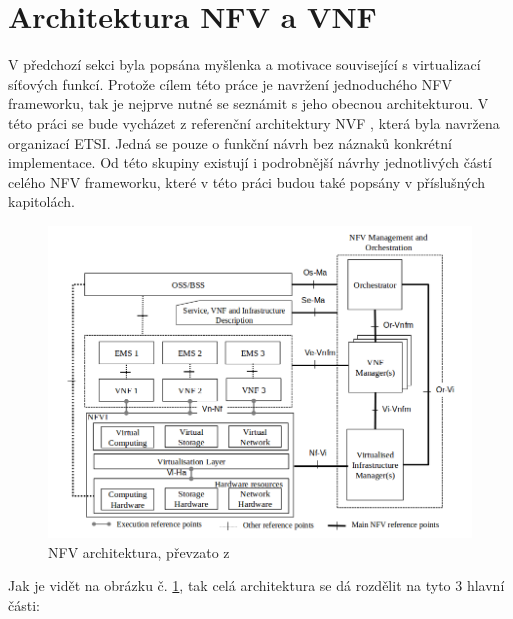 \section{Architektura NFV a VNF}

V předchozí sekci byla popsána myšlenka a motivace související s virtualizací síťových funkcí. Protože cílem této práce je navržení jednoduchého NFV frameworku, tak je nejprve nutné se seznámit s jeho obecnou architekturou. V této práci se bude vycházet z referenční architektury NVF \cite{NFV_architektura}, která byla navržena organizací ETSI. Jedná se pouze o funkční návrh bez náznaků konkrétní implementace. Od této skupiny existují i podrobnější návrhy jednotlivých částí celého NFV frameworku, které v této práci budou také popsány v příslušných kapitolách.

\begin{figure}[h]
\begin{centering}
\includegraphics[scale=0.5]{images/NFV_architektura}
\par\end{centering}
\caption{NFV architektura, převzato z \cite{NFV_architektura}\label{fig:NFV_architektura}}
\end{figure}

Jak je vidět na obrázku č. \ref{fig:NFV_architektura}, tak celá architektura se dá rozdělit na tyto 3 hlavní části:

